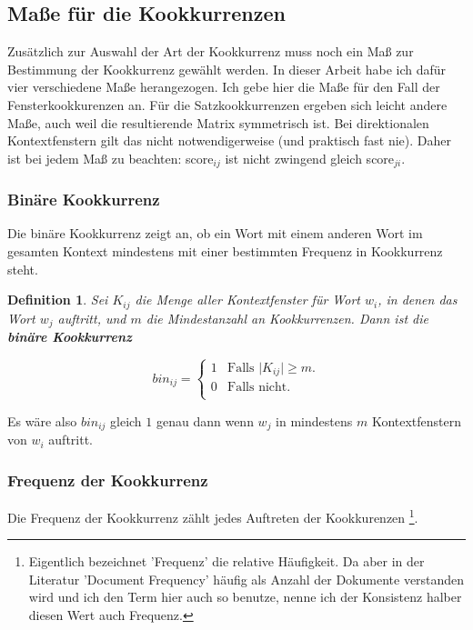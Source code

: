 \documentclass[11pt,numbers=noenddot]{scrartcl}
\newtheorem*{defi}{Definition}
\begin{document}
\subsection{Maße für die Kookkurrenzen} \label{coocmeasures}

Zusätzlich zur Auswahl der Art der Kookkurrenz muss noch ein Maß zur Bestimmung der Kookkurrenz gewählt werden. In dieser Arbeit habe ich dafür vier verschiedene Maße herangezogen. Ich gebe hier die Maße für den Fall der Fensterkookkurenzen an. Für die Satzkookkurrenzen ergeben sich leicht andere Maße, auch weil die resultierende Matrix symmetrisch ist. Bei direktionalen Kontextfenstern gilt das nicht notwendigerweise (und praktisch fast nie). Daher ist bei jedem Maß zu beachten: score$_{ij}$ ist nicht zwingend gleich score$_{ji}$.

\subsubsection{Binäre Kookkurrenz}

Die binäre Kookkurrenz zeigt an, ob ein Wort mit einem anderen Wort im gesamten Kontext mindestens mit einer bestimmten Frequenz in Kookkurrenz steht.

\begin{defi}
Sei $K_{ij}$ die Menge aller Kontextfenster für Wort $w_i$, in denen das Wort $w_j$ auftritt, und $m$ die Mindestanzahl an Kookkurrenzen. Dann ist die \textbf{binäre Kookkurrenz}

\begin{equation*}
   bin_{ij} =
   \begin{cases}
        1 & \text{Falls |$K_{ij}| \ge m$.}\\
        0 & \text{Falls nicht.}\\
   \end{cases}
\end{equation*}
\end{defi}

Es wäre also $bin_{ij}$ gleich $1$ genau dann wenn $w_j$ in mindestens $m$ Kontextfenstern von $w_i$ auftritt. 

\subsubsection{Frequenz der Kookkurrenz}

Die Frequenz der Kookkurrenz zählt jedes Auftreten der Kookkurenzen \footnote{Eigentlich bezeichnet  'Frequenz' die relative Häufigkeit. Da aber in der Literatur 'Document Frequency' häufig als Anzahl der Dokumente verstanden wird und ich den Term hier auch so benutze, nenne ich der Konsistenz halber diesen Wert auch Frequenz. }.
\end{document}
